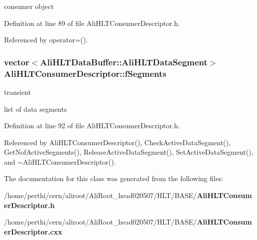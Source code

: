 consumer object 

Definition at line 89 of file Ali\-HLTConsumer\-Descriptor.h.

Referenced by operator=().
\subsubsection{\setlength{\rightskip}{0pt plus 5cm}vector$<${\bf Ali\-HLTData\-Buffer::Ali\-HLTData\-Segment}$>$ {\bf Ali\-HLTConsumer\-Descriptor::f\-Segments}\hspace{0.3cm}{\tt  [private]}}\label{classAliHLTConsumerDescriptor_r1}


transient 

list of data segments 

Definition at line 92 of file Ali\-HLTConsumer\-Descriptor.h.

Referenced by Ali\-HLTConsumer\-Descriptor(), Check\-Active\-Data\-Segment(), Get\-Nof\-Active\-Segments(), Release\-Active\-Data\-Segment(), Set\-Active\-Data\-Segment(), and $\sim$Ali\-HLTConsumer\-Descriptor().

The documentation for this class was generated from the following files:\begin{CompactItemize}
\item 
/home/perthi/cern/aliroot/Ali\-Root\_\-head020507/HLT/BASE/{\bf Ali\-HLTConsumer\-Descriptor.h}\item 
/home/perthi/cern/aliroot/Ali\-Root\_\-head020507/HLT/BASE/{\bf Ali\-HLTConsumer\-Descriptor.cxx}\end{CompactItemize}

